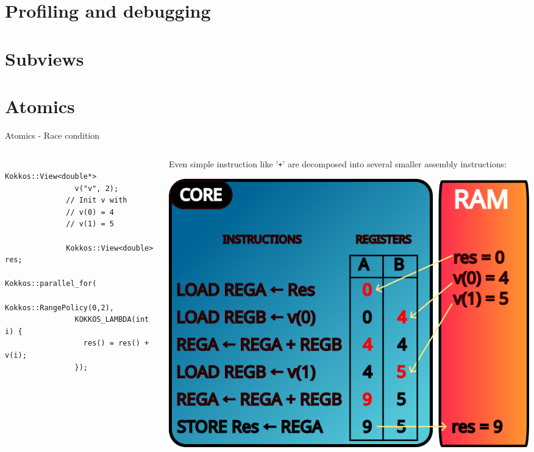 \documentclass[
    aspectratio=169,
    handout,
]{beamer}
\begin{document}

\section{Profiling and debugging}


\section{Subviews}


\section{Atomics}

\begin{frame}[fragile]{Atomics - Race condition}
    \begin{columns}
        \begin{column}{0.4\linewidth}
            \begin{verbatim}
              Kokkos::View<double*>
                v("v", 2);
              // Init v with
              // v(0) = 4
              // v(1) = 5

              Kokkos::View<double> res;
              Kokkos::parallel_for(
                Kokkos::RangePolicy(0,2),
                KOKKOS_LAMBDA(int i) {
                  res() = res() + v(i);
                });
            \end{verbatim}
        \end{column}
        \begin{column}{0.6\linewidth}
          Even simple instruction like '\texttt{+}' are decomposed into several smaller assembly instructions:

          \includegraphics{race_condition1.png}
        \end{column}
    \end{columns}
\end{frame}
\end{document}
